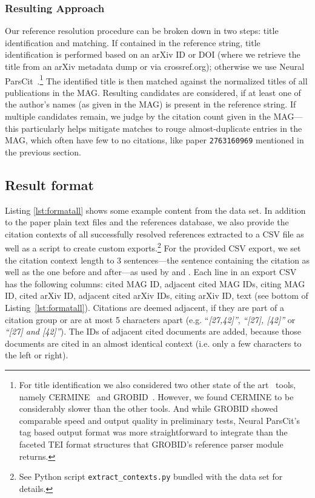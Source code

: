 \subsubsection{Resulting Approach}
Our reference resolution procedure can be broken down in two steps: title identification and matching. If contained in the reference string, title identification is performed based on an arXiv ID or DOI (where we retrieve the title from an arXiv metadata dump or via crossref.org); otherwise we use Neural ParsCit~\cite{Animesh2018}.\footnote{For title identification we also considered two other state of the art~\cite{Tkaczyk2018} tools, namely  CERMINE~\cite{Tkaczyk2015} and GROBID~\cite{Lopez2009}. However, we found CERMINE to be considerably slower than the other tools. And while GROBID showed comparable speed and output quality in preliminary tests, Neural ParsCit's tag based output format was more straightforward to integrate than the faceted TEI format structures that GROBID's reference parser module returns.}
The identified title is then matched against the normalized titles of all publications in the MAG. Resulting candidates are considered, if at least one of the author's names (as given in the MAG) is present in the reference string. If multiple candidates remain, we judge by the citation count given in the MAG---this particularly helps mitigate matches to rouge almost-duplicate entries in the MAG, which often have few to no citations, like paper \texttt{2763160969} mentioned in the previous section.

\subsection{Result format}
Listing \ref{lst:formatall} shows some example content from the data set. In addition to the paper plain text files and the references database, we also provide the citation contexts of all successfully resolved references extracted to a CSV file as well as a script to create custom exports.\footnote{See Python script \texttt{extract\_contexts.py} bundled with the data set for details.} For the provided CSV export, we set the citation context length to 3 sentences---the sentence containing the citation as well as the one before and after---as used by \cite{Tang2014fixed} and \cite{Huang2015fixed}. Each line in an export CSV has the following columns: cited MAG ID, adjacent cited MAG IDs, citing MAG ID, cited arXiv ID, adjacent cited arXiv IDs, citing arXiv ID, text (see bottom of Listing~\ref{lst:formatall}). Citations are deemed adjacent, if they are part of a citation group or are at most 5 characters apart (e.g. ``\emph{[27,42]''}, \emph{``[27], [42]''} or \emph{``[27] and [42]''}). The IDs of adjacent cited documents are added, because those documents are cited in an almost identical context (i.e. only a few characters to the left or right).

